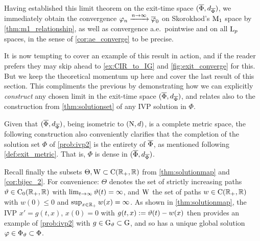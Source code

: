 Having established this limit theorem on the exit-time space $(\overline{\Phi},d_{\overline{\Phi}})$, we immediately obtain the convergence $\varphi_n\xrightarrow{n\to\infty}\overline{\varphi}_0$ on Skorokhod's $\mathrm{M}_1$ space by \autoref{thm:m1_relationship}, as well as convergence a.e.~pointwise and on all $\mathrm{L}_p$ spaces, in the sense of \autoref{cor:ae_converge} to be precise.

It is now tempting to cover an example of this result in action, and if the reader prefers they may skip ahead to \autoref{ex:CIR_to_IG} and \autoref{fig:exit_converge} for this. But we keep the theoretical momentum up here and cover the last result of this section. This compliments the previous by demonstrating how we can explicitly \emph{construct} any chosen limit in the exit-time space $(\overline{\Phi},d_{\overline{\Phi}})$, and relates also to the construction from \autoref{thm:solutionset} of any IVP solution in $\Phi$.

Given that $(\overline{\Phi},d_{\overline{\Phi}})$, being isometric to $(\mathrm{N},d)$, is a complete metric space, the following construction also conveniently clarifies that the completion of the solution set $\Phi$ of \autoref{prob:ivp2} is the entirety of $\overline{\Phi}$, as mentioned following \autoref{def:exit_metric}. That is, $\Phi$ is dense in $(\overline{\Phi},d_{\overline{\Phi}})$.

Recall finally the subsets $\Theta,\mathrm{W}\subset\mathrm{C}(\mathbb{R}_+,\mathbb{R})$ from \autoref{thm:solutionmap} and \autoref{cor:bijec_2}. For convenience: $\Theta$ denotes the set of strictly increasing paths $\vartheta\in\mathrm{C}_0(\mathbb{R}_+,\mathbb{R})$ with $\lim_{t\to\infty}\vartheta(t)=\infty$, and $\mathrm{W}$ the set of paths $w\in\mathrm{C}(\mathbb{R}_+,\mathbb{R})$ with $w(0)\le0$ and $\sup_{x\in\mathbb{R}_+}w(x)=\infty$. As shown in \autoref{thm:solutionmap}, the IVP $x'=g(t,x)$, $x(0)=0$ with $g(t,x):=\vartheta(t)-w(x)$ then provides an example of \autoref{prob:ivp2} with $g\in\mathrm{G}_\vartheta\subset\mathrm{G}$, and so has a unique global solution $\varphi\in\Phi_\vartheta\subset\Phi$.

